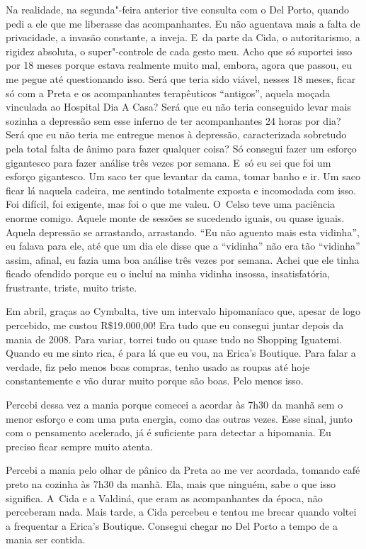 Na realidade, na segunda"-feira anterior tive consulta com o Del Porto,
quando pedi a ele que me liberasse das acompanhantes. Eu não aguentava
mais a falta de privacidade, a invasão constante, a inveja. E~da parte
da Cida, o autoritarismo, a rigidez absoluta, o super"-controle de cada
gesto meu. Acho que só suportei isso por 18 meses porque estava
realmente muito mal, embora, agora que passou, eu me pegue até
questionando isso. Será que teria sido viável, nesses 18 meses, ficar só
com a Preta e os acompanhantes terapêuticos ``antigos'', aquela moçada
vinculada ao Hospital Dia A Casa? Será que eu não teria conseguido levar
mais sozinha a depressão sem esse inferno de ter acompanhantes 24 horas
por dia? Será que eu não teria me entregue menos à depressão,
caracterizada sobretudo pela total falta de ânimo para fazer qualquer
coisa? Só consegui fazer um esforço gigantesco para fazer análise três
vezes por semana. E~só eu sei que foi um esforço gigantesco. Um saco ter
que levantar da cama, tomar banho e ir. Um saco ficar lá naquela
cadeira, me sentindo totalmente exposta e incomodada com isso. Foi
difícil, foi exigente, mas foi o que me valeu. O~Celso teve uma
paciência enorme comigo. Aquele monte de sessões se sucedendo iguais, ou
quase iguais. Aquela depressão se arrastando, arrastando. ``Eu não
aguento mais esta vidinha'', eu falava para ele, até que um dia ele
disse que a ``vidinha'' não era tão ``vidinha'' assim, afinal, eu fazia
uma boa análise três vezes por semana. Achei que ele tinha ficado
ofendido porque eu o incluí na minha vidinha insossa, insatisfatória,
frustrante, triste, muito triste.

Em abril, graças ao Cymbalta, tive um intervalo hipomaníaco que, apesar
de logo percebido, me custou R\$19.000,00! Era tudo que eu consegui
juntar depois da mania de 2008. Para variar, torrei tudo ou quase tudo
no Shopping Iguatemi. Quando eu me sinto rica, é para lá que eu vou, na
Erica's Boutique. Para falar a verdade, fiz pelo menos boas compras,
tenho usado as roupas até hoje constantemente e vão durar muito porque
são boas. Pelo menos isso.

Percebi dessa vez a mania porque comecei a acordar às 7h30 da manhã sem
o menor esforço e com uma puta energia, como das outras vezes. Esse
sinal, junto com o pensamento acelerado, já é suficiente para detectar a
hipomania. Eu preciso ficar sempre muito atenta.

Percebi a mania pelo olhar de pânico da Preta ao me ver acordada,
tomando café preto na cozinha às 7h30 da manhã. Ela, mais que ninguém,
sabe o que isso significa. A~Cida e a Valdiná, que eram as acompanhantes
da época, não perceberam nada. Mais tarde, a Cida percebeu e tentou me
brecar quando voltei a frequentar a Erica's Boutique. Consegui chegar no
Del Porto a tempo de a mania ser contida.

